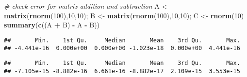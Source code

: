 \documentclass[]{article}
\newenvironment{Shaded}{\begin{snugshade}}{\end{snugshade}}
\newcommand{\CommentTok}[1]{\textcolor[rgb]{0.56,0.35,0.01}{\textit{#1}}}
\newcommand{\DecValTok}[1]{\textcolor[rgb]{0.00,0.00,0.81}{#1}}
\newcommand{\KeywordTok}[1]{\textcolor[rgb]{0.13,0.29,0.53}{\textbf{#1}}}
\newcommand{\NormalTok}[1]{#1}
\newcommand{\OperatorTok}[1]{\textcolor[rgb]{0.81,0.36,0.00}{\textbf{#1}}}
\newcommand{\StringTok}[1]{\textcolor[rgb]{0.31,0.60,0.02}{#1}}
\begin{document}
\begin{Shaded}
\begin{Highlighting}[]
\CommentTok{# check error for matrix addition and subtraction}
\NormalTok{A <-}\StringTok{ }\KeywordTok{matrix}\NormalTok{(}\KeywordTok{rnorm}\NormalTok{(}\DecValTok{100}\NormalTok{),}\DecValTok{10}\NormalTok{,}\DecValTok{10}\NormalTok{); B <-}\StringTok{ }\KeywordTok{matrix}\NormalTok{(}\KeywordTok{rnorm}\NormalTok{(}\DecValTok{100}\NormalTok{),}\DecValTok{10}\NormalTok{,}\DecValTok{10}\NormalTok{); C <-}\StringTok{ }\KeywordTok{rnorm}\NormalTok{(}\DecValTok{10}\NormalTok{)}
\KeywordTok{summary}\NormalTok{(}\KeywordTok{c}\NormalTok{((A }\OperatorTok{+}\StringTok{ }\NormalTok{B) }\OperatorTok{-}\StringTok{ }\NormalTok{A }\OperatorTok{-}\StringTok{ }\NormalTok{B))}
\end{Highlighting}
\end{Shaded}

\begin{verbatim}
##       Min.    1st Qu.     Median       Mean    3rd Qu.       Max. 
## -4.441e-16  0.000e+00  0.000e+00 -1.023e-18  0.000e+00  4.441e-16
\end{verbatim}

\begin{Shaded}
\end{Shaded}

\begin{verbatim}
##       Min.    1st Qu.     Median       Mean    3rd Qu.       Max. 
## -7.105e-15 -8.882e-16  6.661e-16 -8.882e-17  2.109e-15  3.553e-15
\end{verbatim}

\begin{Shaded}
\end{Shaded}
\end{document}
